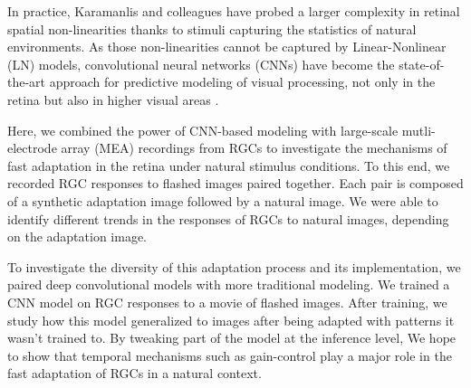 In practice, Karamanlis and colleagues \citep{kim_nonlinear_2020} have
probed a larger complexity in retinal spatial non-linearities thanks to stimuli
capturing the statistics of natural environments.
As those non-linearities cannot be captured by Linear-Nonlinear (LN) models,
convolutional neural networks (CNNs) have become the state-of-the-art approach
for predictive modeling of visual processing, not only in the retina but also
in higher visual areas \citep{mcintosh_deep_2017}.

Here, we combined the power of CNN-based modeling with large-scale
mutli-electrode array (MEA) recordings from RGCs to investigate the mechanisms
of fast
adaptation in the retina under natural stimulus conditions. To this end, we
recorded RGC responses to flashed images paired together. Each pair is composed
of a synthetic adaptation image followed by a natural image. We were able to
identify different trends in the responses of RGCs to natural images, depending
on the adaptation image. %

To investigate the diversity of this adaptation process and its implementation,
we paired deep convolutional models with more traditional modeling. We trained
a CNN model on RGC responses to a movie of flashed images. After training, we
study how this model generalized to images after being adapted with
patterns it wasn't trained to. By tweaking part of the model at the inference
level, We hope to show that temporal mechanisms such as gain-control play a
major role in the fast adaptation of RGCs in a natural context.

\clearpage